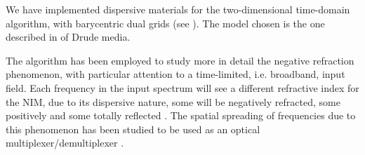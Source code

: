 We have implemented dispersive materials for the two-dimensional
time-domain algorithm, with barycentric dual grids (see
). The model chosen is the one described in
\cite{taflove_computational} of Drude media.

The algorithm has been employed to study more in detail the negative
refraction phenomenon, with particular attention to a time-limited,
i.e. broadband, input field. Each frequency in the input spectrum will
see a different refractive index for the NIM, due to its dispersive
nature, some will be negatively refracted, some positively and some
totally reflected \cite{bolla_energy}. The spatial spreading of
frequencies due to this phenomenon has been studied to be used as an
optical multiplexer/demultiplexer \cite{wu_superprism}.

















